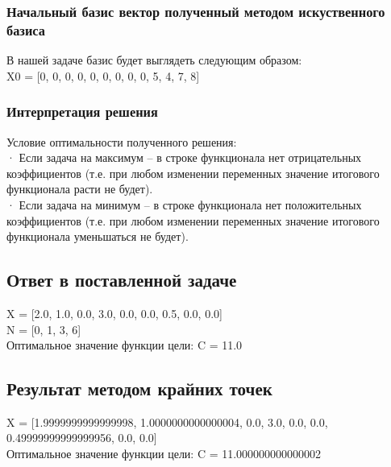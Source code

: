 \documentclass[a4]{article}
\begin{document}
			\subsubsection{Начальный базис вектор полученный методом искуственного базиса}
				В нашей задаче базис будет выглядеть следующим образом:\\
				X0 = [0, 0, 0, 0, 0, 0, 0, 0, 0, 5, 4, 7, 8]
			\subsubsection{Интерпретация решения}
				Условие оптимальности полученного решения:\\
				· Если задача на максимум – в строке функционала нет отрицательных коэффициентов (т.е. при любом изменении переменных значение итогового функционала расти не будет).\\
				· Если задача на минимум – в строке функционала нет положительных коэффициентов (т.е. при любом изменении переменных значение итогового функционала уменьшаться не будет).
			
			\subsection{Ответ в поставленной задаче}
				X = [2.0, 1.0, 0.0, 3.0, 0.0, 0.0, 0.5, 0.0, 0.0]\\
				
				N = [0, 1, 3, 6]\\
				
				Оптимальное значение функции цели: C = 11.0
			\subsection{Результат методом крайних точек}
				X = [1.9999999999999998, 1.0000000000000004, 0.0, 3.0, 0.0, 0.0, 0.49999999999999956, 0.0, 0.0]\\
				
				Оптимальное значение функции цели: C = 11.000000000000002
\end{document}
